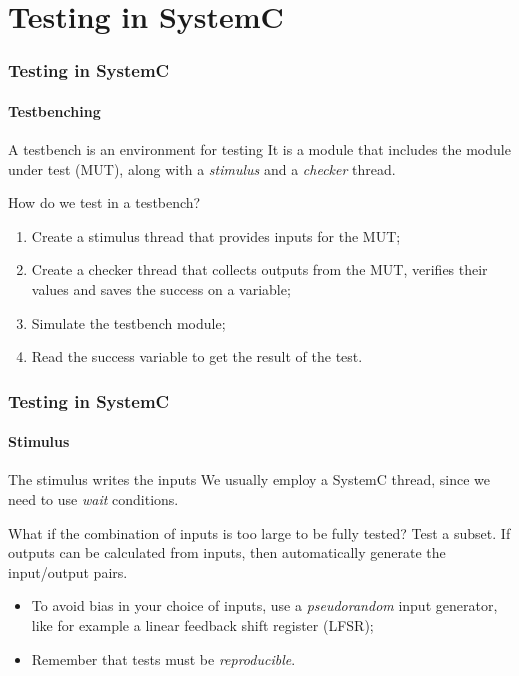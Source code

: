 \section{Testing in SystemC}

\begin{frame}
\frametitle{Testing in SystemC}
\framesubtitle{Testbenching}

\begin{block}{A testbench is an environment for testing}
It is a module that includes the module under test (MUT), along with a {\em stimulus} and a {\em checker} thread.
\end{block}
\pause
\begin{block}{How do we test in a testbench?}
\begin{enumerate}
\item Create a stimulus thread that provides inputs for the MUT;
\pause
\item Create a checker thread that collects outputs from the MUT, verifies their values and saves the success on a variable;
\pause
\item Simulate the testbench module;
\pause
\item Read the success variable to get the result of the test.
\end{enumerate}
\end{block}

\end{frame}

\begin{frame}
\frametitle{Testing in SystemC}
\framesubtitle{Stimulus}

\begin{block}{The stimulus writes the inputs}
We usually employ a SystemC thread, since we need to use {\em wait} conditions.
\end{block}
\pause
\begin{block}{What if the combination of inputs is too large to be fully tested?}
Test a subset. If outputs can be calculated from inputs, then automatically generate the input/output pairs. 
\begin{itemize}
\item To avoid bias in your choice of inputs, use a {\em pseudorandom} input generator, like for example a linear feedback shift register (LFSR);
\item Remember that tests must be {\em reproducible}.
\end{itemize}
\end{block}

\end{frame}

